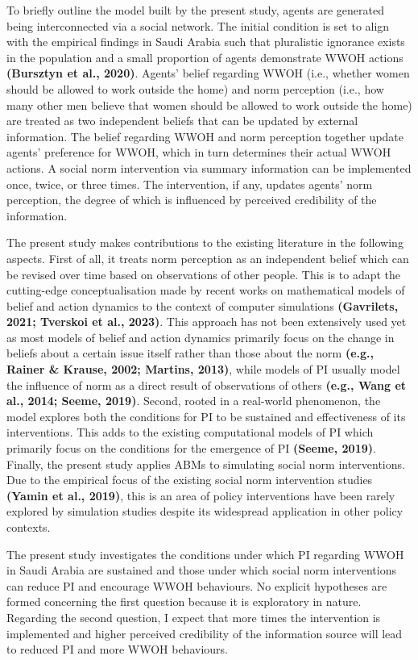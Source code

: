 \documentclass[
  11pt,
]{article}
\begin{document}
To briefly outline the model built by the present study, agents are
generated being interconnected via a social network. The initial
condition is set to align with the empirical findings in Saudi Arabia
such that pluralistic ignorance exists in the population and a small
proportion of agents demonstrate WWOH actions \textbf{(Bursztyn et al.,
2020)}. Agents' belief regarding WWOH (i.e., whether women should be
allowed to work outside the home) and norm perception (i.e., how many
other men believe that women should be allowed to work outside the home)
are treated as two independent beliefs that can be updated by external
information. The belief regarding WWOH and norm perception together
update agents' preference for WWOH, which in turn determines their
actual WWOH actions. A social norm intervention via summary information
can be implemented once, twice, or three times. The intervention, if
any, updates agents' norm perception, the degree of which is influenced
by perceived credibility of the information.

The present study makes contributions to the existing literature in the
following aspects. First of all, it treats norm perception as an
independent belief which can be revised over time based on observations
of other people. This is to adapt the cutting-edge conceptualisation
made by recent works on mathematical models of belief and action
dynamics to the context of computer simulations \textbf{(Gavrilets,
2021; Tverskoi et al., 2023)}. This approach has not been extensively
used yet as most models of belief and action dynamics primarily focus on
the change in beliefs about a certain issue itself rather than those
about the norm \textbf{(e.g., Rainer \& Krause, 2002; Martins, 2013)},
while models of PI usually model the influence of norm as a direct
result of observations of others \textbf{(e.g., Wang et al., 2014;
Seeme, 2019)}. Second, rooted in a real-world phenomenon, the model
explores both the conditions for PI to be sustained and effectiveness of
its interventions. This adds to the existing computational models of PI
which primarily focus on the conditions for the emergence of PI
\textbf{(Seeme, 2019)}. Finally, the present study applies ABMs to
simulating social norm interventions. Due to the empirical focus of the
existing social norm intervention studies \textbf{(Yamin et al., 2019)},
this is an area of policy interventions have been rarely explored by
simulation studies despite its widespread application in other policy
contexts.

The present study investigates the conditions under which PI regarding
WWOH in Saudi Arabia are sustained and those under which social norm
interventions can reduce PI and encourage WWOH behaviours. No explicit
hypotheses are formed concerning the first question because it is
exploratory in nature. Regarding the second question, I expect that more
times the intervention is implemented and higher perceived credibility
of the information source will lead to reduced PI and more WWOH
behaviours.
\end{document}
